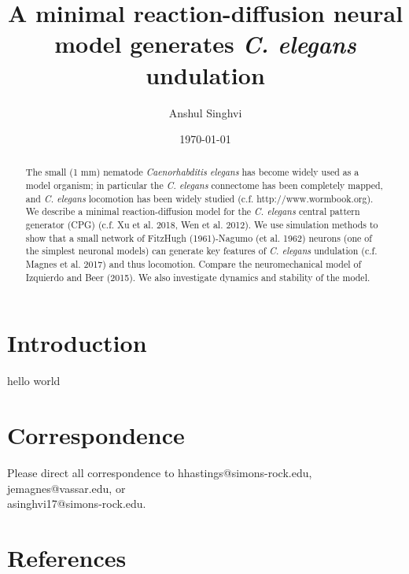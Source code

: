 \documentclass[
    11pt,
    preprint,
    author-numerical,
    aps
]{revtex4-2}
\begin{document}

\title{A minimal reaction-diffusion neural model generates {\emph{C. elegans}} undulation}
\author{Anshul Singhvi}
\date{\today}
\begin{abstract}
    The small (1 mm) nematode \emph{Caenorhabditis elegans} has become widely used as a model organism; in particular the \emph{C. elegans} connectome has been completely mapped, and \emph{C. elegans} locomotion has been widely studied (c.f. http://www.wormbook.org). We describe a minimal reaction-diffusion model for the \emph{C. elegans} central pattern generator (CPG) (c.f. Xu et al. 2018, Wen et al. 2012). We use simulation methods to show that a small network of FitzHugh (1961)-Nagumo (et al. 1962) neurons (one of the simplest neuronal models) can generate key features of \emph{C. elegans} undulation (c.f. Magnes et al. 2017) and thus locomotion. Compare the neuromechanical model of Izquierdo and Beer (2015). We also investigate dynamics and stability of the model.
\end{abstract}

\maketitle

\section{Introduction}\label{sec: intro}

hello world



\section{Correspondence}\label{correspondence}
\makeatletter
Please direct all correspondence to hhastings@simons-rock.edu,
jemagnes@vassar.edu, or\\asinghvi17@simons-rock.edu.
\makeatother

\section{References}

\nocite{*}

\end{document}
